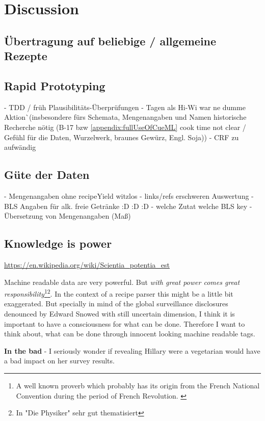 \documentclass[12pt, twoside]{report}
\begin{document}
\chapter{Discussion}
\section{Übertragung auf beliebige / allgemeine Rezepte}

\section{Rapid Prototyping}
- TDD / früh Plausibilitäts-Überprüfungen - Tagen als Hi-Wi war ne dumme Aktion^^ (insbesondere fürs Schemata, Mengenangaben und Namen historische Recherche nötig (B-17 bzw \cref{appendix:fullUseOfCueML} cook time not clear / Gefühl für die Daten, Wurzelwerk, braunes Gewürz,	Engl. Soja))
- CRF zu aufwändig 

\section{Güte der Daten}
- Mengenangaben ohne recipeYield witzlos
- links/refs erschweren Auswertung
- BLS Angaben für alk. freie Getränke :D :D :D
- welche Zutat welche BLS key
- Übersetzung von Mengenangaben (Maß)

\section{Knowledge is power}
\url{https://en.wikipedia.org/wiki/Scientia_potentia_est}

Machine readable data are very powerful. But \textit{with great power comes great responsibility}\footnote{A well known proverb which probably has its origin from the French National Convention during the period of French Revolution. \parencite{quoteInvestigator}}\footnote{In "Die Physiker" sehr gut thematisiert}. In the context of a recipe parser this might be a little bit exaggerated. But specially in mind of the global surveillance disclosures denounced by Edward Snowed with still uncertain dimension, I think it is important to have a consciousness for what can be done. Therefore I want to think about, what can be done through innocent looking machine readable tags. 
\bigskip


\textbf{In the bad} \parencite{clintonHealth} - I seriously wonder if revealing Hillary were a vegetarian would have a bad impact on her survey results. 
\end{document}
